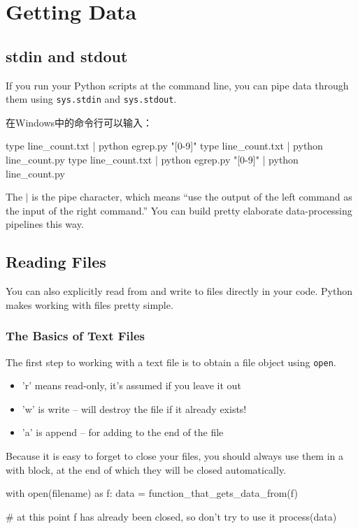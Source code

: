 \chapter{Getting Data}
\section{stdin and stdout}
If you run your Python scripts at the command line, you can pipe data through them
using \verb|sys.stdin| and \verb|sys.stdout|.

在Windows中的命令行可以输入：
\begin{pyc}
    type line_count.txt | python egrep.py "[0-9]"
    type line_count.txt | python line_count.py
    type line_count.txt | python egrep.py "[0-9]" | python line_count.py
\end{pyc}

The $\mid$ is the pipe character, which means “use the output of the left command as the
input of the right command.” You can build pretty elaborate data-processing pipelines
this way.

\section{Reading Files}
You can also explicitly read from and write to files directly in your code. Python
makes working with files pretty simple.
\subsection{The Basics of Text Files}
The first step to working with a text file is to obtain a file object using \verb|open|.

\begin{itemize}
    \item 'r' means read-only, it's assumed if you leave it out
    \item 'w' is write -- will destroy the file if it already exists!
    \item 'a' is append -- for adding to the end of the file
\end{itemize}

Because it is easy to forget to close your files, you should always use them in a with
block, at the end of which they will be closed automatically.

\begin{pyc}
    with open(filename) as f:
    data = function_that_gets_data_from(f)

    # at this point f has already been closed, so don't try to use it
    process(data)
\end{pyc}

